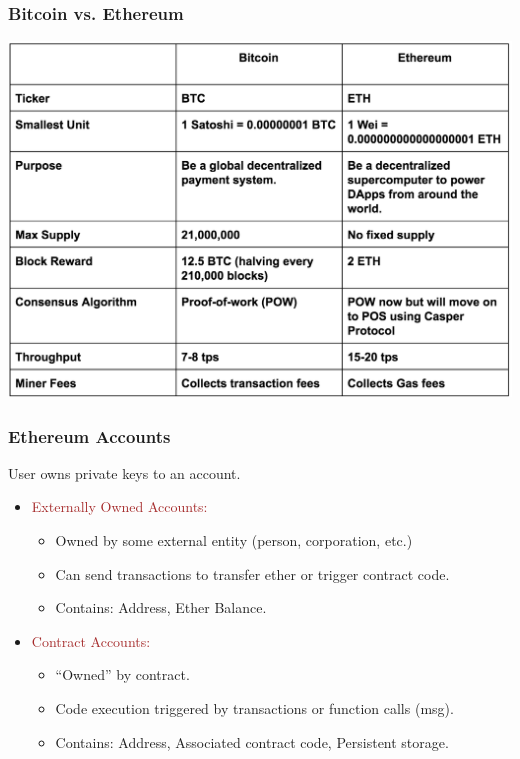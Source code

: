 \documentclass{beamer}
\begin{document}
\begin{frame}
  \frametitle{Bitcoin vs. Ethereum}
 	\centering
	\includegraphics[scale=0.23]{comparison}
\end{frame}
\begin{frame}
  \frametitle{Ethereum Accounts}
  User owns private keys to an account. \pause
  \begin{itemize}
  	\item \textcolor{brown}{Externally Owned Accounts:}
  	\begin{itemize}
		\item Owned by some external entity (person, corporation, etc.)
		\item Can send transactions to transfer  ether or trigger contract code.
		\item Contains: Address, Ether Balance.
	\end{itemize}
	\pause
	\item \textcolor{brown}{Contract Accounts:}
	\begin{itemize}
		\item ``Owned'' by contract.
		\item Code execution triggered by  transactions or function calls (msg).
		\item Contains: Address, Associated contract code, Persistent storage.
	\end{itemize}
  \end{itemize}
\end{frame}
\end{document}
